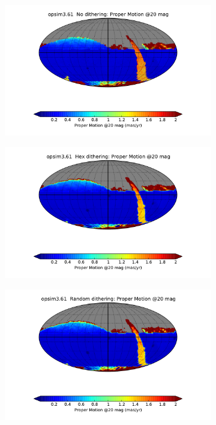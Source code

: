 \documentclass[]{spie}  %
\begin{document}
\begin{figure}
\centering
\begin{subfigure}[]{0.3\textwidth}
\includegraphics[width=\textwidth]{figures/opsim3_61_Proper_Motion_@20_mag__No_dithering_HEAL_SkyMap}
\caption[]{}
\label{subfig:pm20no}
\end{subfigure}
\begin{subfigure}[]{0.3\textwidth}
\includegraphics[width=\textwidth]{figures/opsim3_61_Proper_Motion_@20_mag__Hex_dithering_HEAL_SkyMap}
\caption[]{}
\label{subfig:pm20hex}
\end{subfigure}
\begin{subfigure}[]{0.3\textwidth}
\includegraphics[width=\textwidth]{figures/opsim3_61_Proper_Motion_@20_mag__Random_dithering_HEAL_SkyMap}
\caption[]{}
\label{subfig:pm20random}
\end{subfigure}



\end{figure}
\end{document}
